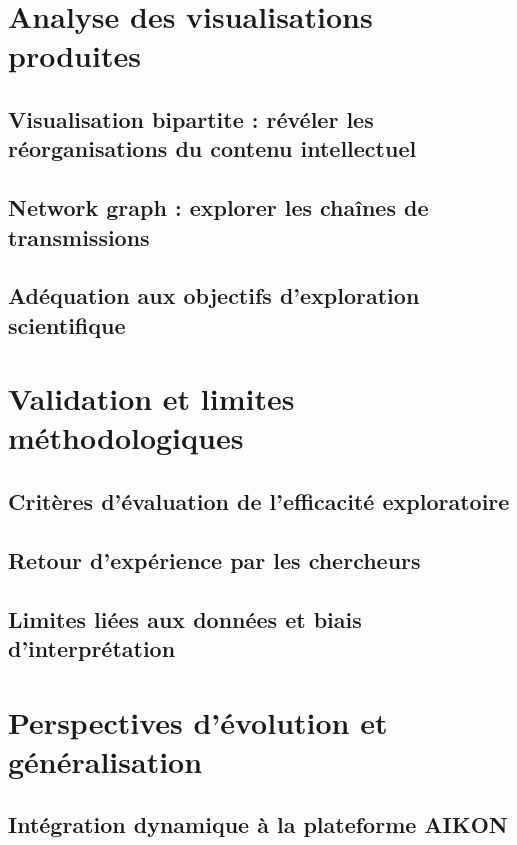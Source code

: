 \documentclass[a4paper,12pt,twoside]{book}
\newcommand{\clearemptydoublepage}{\newpage{\pagestyle{empty}\cleardoublepage}}
\begin{document}
	\chapter{Analyse des visualisations produites}
	\section{Visualisation bipartite : révéler les réorganisations du contenu intellectuel}
	
	
	\section{Network graph : explorer les chaînes de transmissions}
	
	
	\section{Adéquation aux objectifs d'exploration scientifique}
	
	
	\clearemptydoublepage
	
	\chapter{Validation et limites méthodologiques}
	\section{Critères d'évaluation de l'efficacité exploratoire}
	
	
	\section{Retour d'expérience par les chercheurs}
	
	
	\section{Limites liées aux données et biais d'interprétation}
	
	
	\clearemptydoublepage
	
	\chapter{Perspectives d'évolution et généralisation}
	\section{Intégration dynamique à la plateforme AIKON}
	
	
\end{document}
